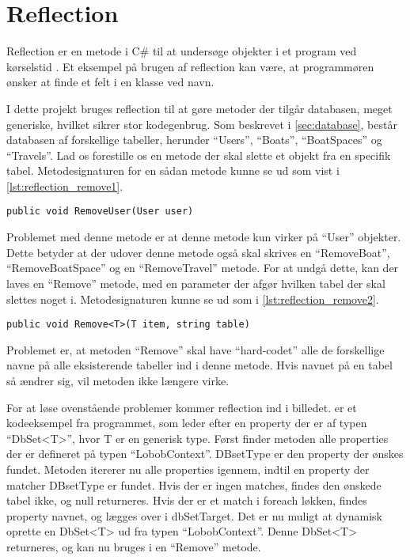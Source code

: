 \section{Reflection}
\label{sec:reflection}

Reflection er en metode i C\# til at undersøge objekter i et program ved kørselstid \cite{michaelis2012essential}. Et eksempel på brugen af reflection kan være, at programmøren ønsker at finde et felt i en klasse ved navn.

I dette projekt bruges reflection til at gøre metoder der tilgår databasen, meget generiske, hvilket sikrer stor kodegenbrug. Som beskrevet i \cref{sec:database}, består databasen af forskellige tabeller, herunder \enquote{Users}, \enquote{Boats}, \enquote{BoatSpaces} og \enquote{Travels}. Lad os forestille os en metode der skal slette et objekt fra en specifik tabel. Metodesignaturen for en sådan metode kunne se ud som vist i \cref{lst:reflection_remove1}.


\begin{lstlisting}[label=lst:reflection_remove1]
public void RemoveUser(User user)
\end{lstlisting}

Problemet med denne metode er at denne metode kun virker på \enquote{User} objekter. Dette betyder at der udover denne metode også skal skrives en \enquote{RemoveBoat}, \enquote{RemoveBoatSpace} og en \enquote{RemoveTravel} metode. For at undgå dette, kan der laves en \enquote{Remove} metode, med en parameter der afgør hvilken tabel der skal slettes noget i. Metodesignaturen kunne se ud som i \cref{lst:reflection_remove2}.


\begin{lstlisting}[label=lst:reflection_remove2]
public void Remove<T>(T item, string table)
\end{lstlisting}

Problemet er, at metoden \enquote{Remove} skal have \enquote{hard-codet} alle de forskellige navne på alle eksisterende tabeller ind i denne metode. Hvis navnet på en tabel så ændrer sig, vil metoden ikke længere virke.

For at løse ovenstående problemer kommer reflection ind i billedet.  er et kodeeksempel fra programmet, som leder efter en property der er af typen \enquote{DbSet<T>}, hvor T er en generisk type. Først finder metoden alle properties der er defineret på typen \enquote{LobobContext}. DBsetType er den property der ønskes fundet. Metoden itererer nu alle properties igennem, indtil en property der matcher DBsetType er fundet. Hvis der er ingen matches, findes den ønskede tabel ikke, og null returneres. Hvis der er et match i foreach løkken, findes property navnet, og lægges over i dbSetTarget. Det er nu muligt at dynamisk oprette en DbSet<T> ud fra typen \enquote{LobobContext}. Denne DbSet<T> returneres, og kan nu bruges i en \enquote{Remove} metode.

